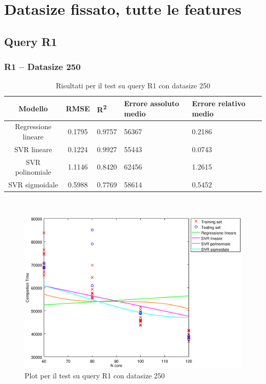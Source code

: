 \documentclass[a4paper,11pt]{article}
\begin{document}
\newpage
\section{Datasize fissato, tutte le features}

\subsection{Query R1}

\subsubsection{R1 -- Datasize 250}
\begin{table}[bhpt]
	\centering
	\begin{adjustbox}{center}
		\begin{tabular}{c | c M{1.2cm} M{2.5cm} M{2.5cm} M{1.8cm}}
			Modello & RMSE & R\textsuperscript{2} & Errore assoluto medio & Errore relativo medio \tabularnewline
			\hline
			Regressione lineare & 0.1795 & 0.9757 &  56367 & 0.2186 \\
			SVR lineare & 0.1224 & 0.9927 &  55443 & 0.0743 \\
			SVR polinomiale & 1.1146 & 0.8420 &  62456 & 1.2615 \\
			SVR sigmoidale & 0.5988 & 0.7769 &  58614 & 0.5452 \\
		\end{tabular}
	\end{adjustbox}
	\\
	\caption{Risultati per il test su query R1 con datasize 250}
	\label{table_R1_250}
\end{table}

\begin {figure}[hbtp]
\centering
\includegraphics[width=\textwidth]{output/R1_250/plot_R1_250.eps}
\caption {Plot per il test su query R1 con datasize 250}
\end {figure}
\end{document}

